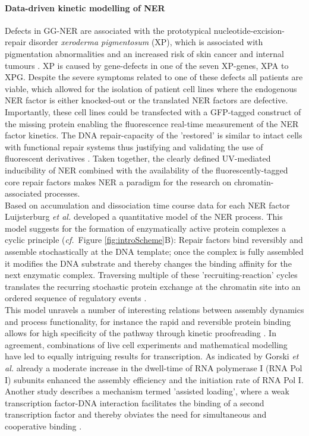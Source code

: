 \paragraph{Data-driven kinetic modelling of NER}
Defects in GG-NER are associated with the prototypical nucleotide-excision-repair disorder \textit{xeroderma pigmentosum} (XP), which is associated with pigmentation abnormalities and an increased risk of skin cancer and internal tumours \cite{Hoeijmakers2009}. XP is caused by gene-defects in one of the seven XP-genes, XPA to XPG. Despite the severe symptoms related to one of these defects all patients are viable, which allowed for the isolation of patient cell lines where the endogenous NER factor is either knocked-out or the translated NER factors are defective. Importantly, these cell lines could be transfected with a GFP-tagged construct of the missing protein enabling the fluorescence real-time measurement of the NER factor kinetics. The DNA repair-capacity of the 'restored' is similar to intact cells with functional repair systems thus justifying and validating the use of fluorescent derivatives \cite{Hoogstraten2002,Hoogstraten2008,Zotter2006,Rademakers2003}. Taken together, the clearly defined UV-mediated inducibility of NER combined with the availability of the fluorescently-tagged core repair factors makes NER a paradigm for the research on chromatin-associated processes.\\
Based on accumulation and dissociation time course data for each NER factor Luijsterburg \textit{et al.}\cite{Luijsterburg2010} developed a quantitative model of the NER process. This model suggests for the formation of enzymatically active protein complexes a cyclic principle (\textit{cf.}\ Figure \ref{fig:introScheme}B): Repair factors bind reversibly and assemble stochastically at the DNA template; once the complex is fully assembled it modifies the DNA substrate and thereby changes the binding affinity for the next enzymatic complex. Traversing multiple of these 'recruiting-reaction' cycles translates the recurring stochastic protein exchange at the chromatin site into an ordered sequence of regulatory events \cite{Dinant:2009:J-Cell-Biol:19332890}.\\
\label{sec:RNA_pol}
This model unravels a number of interesting relations between assembly dynamics and process functionality, for instance the rapid and reversible protein binding allows for high specificity of the pathway through kinetic proofreading \cite{Luijsterburg2010}. In agreement, combinations of live cell experiments and mathematical modelling have led to equally intriguing results for transcription. As indicated by Gorski \textit{et al.} \cite{Gorski:2008:Mol-Cell:18498750} already a moderate increase in the dwell-time of RNA polymerase I (RNA Pol I) subunits enhanced the assembly efficiency and the initiation rate of RNA Pol I. Another study describes a mechanism termed 'assisted loading', where a weak transcription factor-DNA interaction facilitates the binding of a second transcription factor and thereby obviates the need for simultaneous and cooperative binding \cite{Voss2011}. \\         
